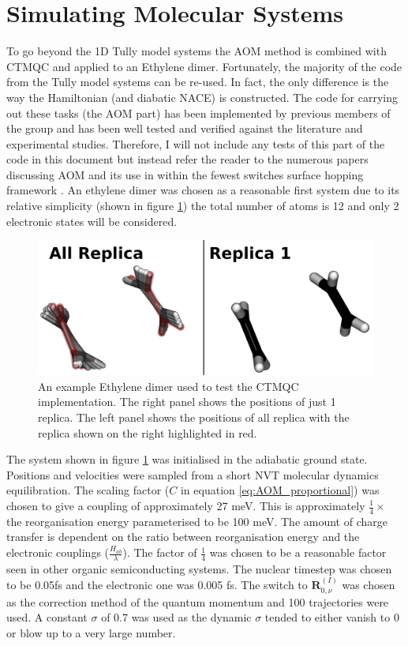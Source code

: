 \section{Simulating Molecular Systems}
To go beyond the 1D Tully model systems the AOM method is combined with CTMQC and applied to an Ethylene dimer. Fortunately, the majority of the code from the Tully model systems can be re-used. In fact, the only difference is the way the Hamiltonian (and diabatic NACE) is constructed. The code for carrying out these tasks (the AOM part) has been implemented by previous members of the group and has been well tested and verified against the literature and experimental studies. Therefore, I will not include any tests of this part of the code in this document but instead refer the reader to the numerous papers discussing AOM and its use in within the fewest switches surface hopping framework \cite{Carof2017FSSH, C9FD00046A, C9CP04770K, FOB-SH_Spencer, C6FD00107F,FlickPolarons, Giannini2018Crossover, Giannini2019, C9TC05270D,Gajdos2014, AOM_vs_HigherOrder}. An ethylene dimer was chosen as a reasonable first system due to its relative simplicity (shown in figure \ref{fig:EthDimer}) the total number of atoms is 12 and only 2 electronic states will be considered.
\begin{figure}[ht]
  \includegraphics[width=\textwidth]{../img/CTMQC/Ethylene_Annotated.png}
	\caption{\label{fig:EthDimer}An example Ethylene dimer used to test the CTMQC implementation. The right panel shows the positions of just 1 replica. The left panel shows the positions of all replica with the replica shown on the right highlighted in red.}
\end{figure}
The system shown in figure \ref{fig:EthDimer} was initialised in the adiabatic ground state. Positions and velocities were sampled from a short NVT molecular dynamics equilibration. The scaling factor ($C$ in equation \eqref{eq:AOM_proportional}) was chosen to give a coupling of approximately 27 meV. This is approximately $\frac{1}{4} \times$ the reorganisation energy \remove{-}parameterised to be 100 meV. The amount of charge transfer is dependent on the ratio between reorganisation energy and the electronic couplings ($\frac{H_{ab}}{\lambda}$). The factor of $\frac{1}{4}$ was chosen to be a reasonable factor \remove{-}seen in other organic semiconducting systems. The nuclear timestep was chosen to be 0.05fs and the electronic one was 0.005 fs. The switch to $\mathbf{R}_{0, \nu}^{(I)}$ was chosen as the correction method of the quantum momentum and 100 trajectories were used. A constant $\sigma$ of 0.7 was used as the dynamic $\sigma$ tended to either vanish to 0 or blow up to a very large number.
